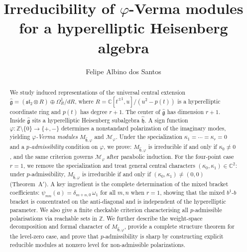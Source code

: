 \documentclass{amsart}
\newcommand{\Cx}{\mathbb{C}}
\newcommand{\Z}{\mathbb{Z}}
\newcommand{\g}{\mathfrak{g}}
\newcommand{\h}{\mathfrak{h}}
\newcommand{\sltwo}{\mathfrak{sl}_2}
\newcommand{\wh}[1]{\widehat{#1}}
\newcommand{\whg}{\wh{\g}}
\newcommand{\whh}{\wh{\h}}
\theoremstyle{definition}
\theoremstyle{remark}
\numberwithin{equation}{section}
\begin{document}
\title[Irreducibility of $\varphi$-Verma modules]{Irreducibility of
\texorpdfstring{$\varphi$}{phi}-Verma modules for a hyperelliptic
Heisenberg algebra}
\author{Felipe Albino dos Santos}
\address{Faculdade de Computa\c{c}\~ao e Inform\'atica,
Universidade Presbiteriana Mackenzie, Rua da Consola\c{c}\~ao, 930,
Consola\c{c}\~ao, S\~ao Paulo, Brazil}
\date{}
\begin{abstract}
We study induced representations of the universal central extension
$\whg = (\sltwo \otimes R)\oplus\Omega_R^1/dR$, where
$R = \Cx[t^{\pm1},u]/(u^2-p(t))$ is a hyperelliptic coordinate ring
and $p(t)$ has degree $r+1$.  The center of $\whg$ has dimension $r+1$.
Inside $\whg$ sits a hyperelliptic Heisenberg subalgebra $\whh$.  A sign
function $\varphi\colon\Z\setminus\{0\}\to\{+,-\}$ determines a
nonstandard polarization of the imaginary modes, yielding
\emph{$\varphi$-Verma modules} $M_{\whh,\varphi}$ and $\mathcal{M}_\varphi$.
Under the specialization $\kappa_1=\cdots=\kappa_r=0$ and a
\emph{$p$-admissibility} condition on $\varphi$, we prove:
$M_{\whh,\varphi}$ is irreducible if and only if $\kappa_0\neq 0$, and the same criterion governs $\mathcal{M}_\varphi$ after
parabolic induction.
For the four-point case $r=1$, we remove the specialization and treat
general central characters $(\kappa_0,\kappa_1)\in\Cx^2$: under
$p$-admissibility, $M_{\whh,\varphi}$ is irreducible if and only if
$(\kappa_0,\kappa_1)\neq(0,0)$ (Theorem~A$'$).  A key ingredient is
the complete determination of the mixed bracket coefficients:
$\psi_{mn}(a)=\delta_{m+n,0}\,\omega_1$ for all $m,n$ when $r=1$,
showing that the mixed $b^1$-$b$ bracket is concentrated on the
anti-diagonal and is independent of the hyperelliptic parameter.
We also give a finite checkable criterion characterising all
$p$-admissible polarisations via reachable sets in $\Z$.
We further describe the weight-space decomposition and formal
character of $M_{\whh,\varphi}$, provide a complete structure theorem
for the level-zero case, and prove that $p$-admissibility is sharp by
constructing explicit reducible modules at nonzero level for
non-admissible polarizations.
\end{abstract}
\maketitle
\setcounter{tocdepth}{1}
\tableofcontents
\end{document}
